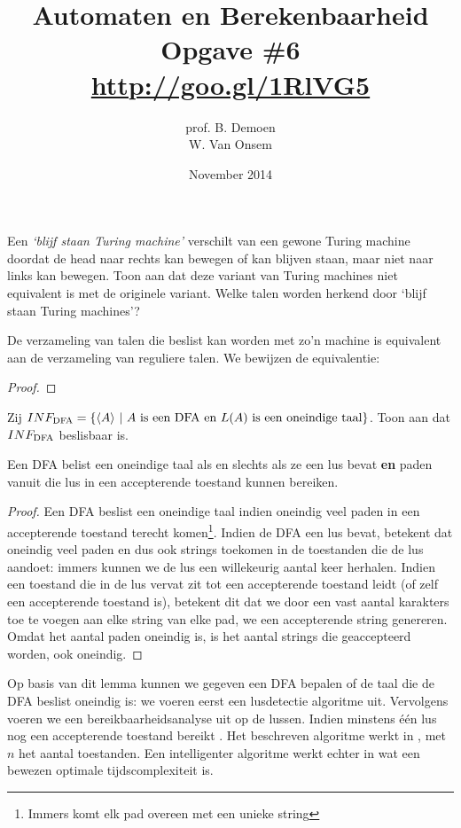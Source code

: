 \documentclass[a4paper]{article}
\title{Automaten en Berekenbaarheid\\Opgave \#6\\\url{http://goo.gl/1RlVG5}}
\author{prof. B. Demoen\\W. Van Onsem}
\date{November 2014}
\begin{document}
\maketitle

\begin{question}
Een \emph{`blijf staan Turing machine'} verschilt van een gewone Turing machine doordat de head naar rechts kan bewegen of kan blijven staan, maar niet naar links kan bewegen. Toon aan dat deze variant van Turing machines niet equivalent is met de originele variant. Welke talen worden herkend door `blijf staan Turing machines'?
\begin{answer}
De verzameling van talen die beslist kan worden met zo'n machine is equivalent aan de verzameling van reguliere talen. We bewijzen de equivalentie:
\begin{proof}

\end{proof}
\end{answer}
\end{question}

\begin{question}
Zij $INF_{\rm DFA} = \{ \langle A \rangle \ | \ \text{$A$ is een DFA en $L(A)$ is een oneindige taal} \} $. Toon aan dat $INF_{\rm DFA}$ beslisbaar is.
\begin{answer}
\begin{lemma}
Een DFA belist een oneindige taal als en slechts als ze een lus bevat \textbf{en} paden vanuit die lus in een accepterende toestand kunnen bereiken.
\begin{proof}
Een DFA beslist een oneindige taal indien oneindig veel paden in een accepterende toestand terecht komen\footnote{Immers komt elk pad overeen met een unieke string}. Indien de DFA een lus bevat, betekent dat oneindig veel paden en dus ook strings toekomen in de toestanden die de lus aandoet: immers kunnen we de lus een willekeurig aantal keer herhalen. Indien een toestand die in de lus vervat zit tot een accepterende toestand leidt (of zelf een accepterende toestand is), betekent dit dat we door een vast aantal karakters toe te voegen aan elke string van elke pad, we een accepterende string genereren. Omdat het aantal paden oneindig is, is het aantal strings die geaccepteerd worden, ook oneindig.
\end{proof}
\end{lemma}
Op basis van dit lemma kunnen we gegeven een DFA bepalen of de taal die de DFA beslist oneindig is: we voeren eerst een lusdetectie algoritme uit. Vervolgens voeren we een bereikbaarheidsanalyse uit op de lussen. Indien minstens \'e\'en lus nog een accepterende toestand bereikt . Het beschreven algoritme werkt in , met $n$ het aantal toestanden. Een intelligenter algoritme werkt echter in  wat een bewezen optimale tijdscomplexiteit is.
\end{answer}

\end{question}
\end{document}
